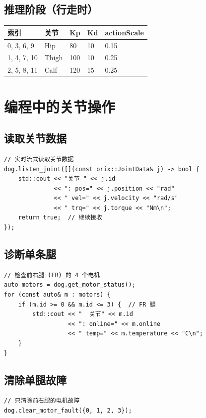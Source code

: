 \documentclass[a4paper,11pt,openany]{book}
\begin{document}
\subsection{推理阶段（行走时）}

\begin{longtable}{lllll}
\toprule
索引 & 关节 & Kp & Kd & actionScale \\
\midrule
\endhead
0, 3, 6, 9  & Hip   & 80  & 10 & 0.15 \\
1, 4, 7, 10 & Thigh & 100 & 10 & 0.25 \\
2, 5, 8, 11 & Calf  & 120 & 15 & 0.25 \\
\bottomrule
\end{longtable}

\section{编程中的关节操作}

\subsection{读取关节数据}

\begin{lstlisting}[style=cpp]
// 实时流式读取关节数据
dog.listen_joint([](const orix::JointData& j) -> bool {
    std::cout << "关节 " << j.id
              << ": pos=" << j.position << "rad"
              << " vel=" << j.velocity << "rad/s"
              << " trq=" << j.torque << "Nm\n";
    return true;  // 继续接收
});
\end{lstlisting}

\subsection{诊断单条腿}

\begin{lstlisting}[style=cpp]
// 检查前右腿 (FR) 的 4 个电机
auto motors = dog.get_motor_status();
for (const auto& m : motors) {
    if (m.id >= 0 && m.id <= 3) {  // FR 腿
        std::cout << "  关节" << m.id
                  << ": online=" << m.online
                  << " temp=" << m.temperature << "C\n";
    }
}
\end{lstlisting}

\subsection{清除单腿故障}

\begin{lstlisting}[style=cpp]
// 只清除前右腿的电机故障
dog.clear_motor_fault({0, 1, 2, 3});
\end{lstlisting}
\end{document}
